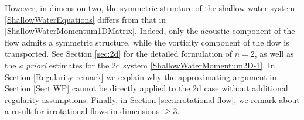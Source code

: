 \documentclass[reqno,11pt]{amsart}
\DeclareMathOperator{\curl}{curl}
\theoremstyle{plain}
\theoremstyle{definition}
\numberwithin{equation}{section}
\begin{document}
\smallskip 

However, in dimension two, the symmetric structure of the shallow water system \eqref{ShallowWaterEquations} differs from that in \eqref{ShallowWaterMomentum1DMatrix}. Indeed, only the acoustic component of the flow admits a symmetric structure, while the vorticity component of the flow is transported. See Section \ref{sec:2d} for the detailed formulation of $ n = 2 $, as well as the \emph{a priori} estimates for the 2d system \eqref{ShallowWaterMomentum2D-1}. 
In Section \ref{Regularity-remark} we explain why the approximating argument in Section \ref{Sect:WP} cannot be directly applied to the 2d case without additional regularity assumptions.
Finally, in Section \ref{sec:irrotational-flow}, we remark about a result for irrotational flows in dimensions $\geq 3$. 

\end{document}
